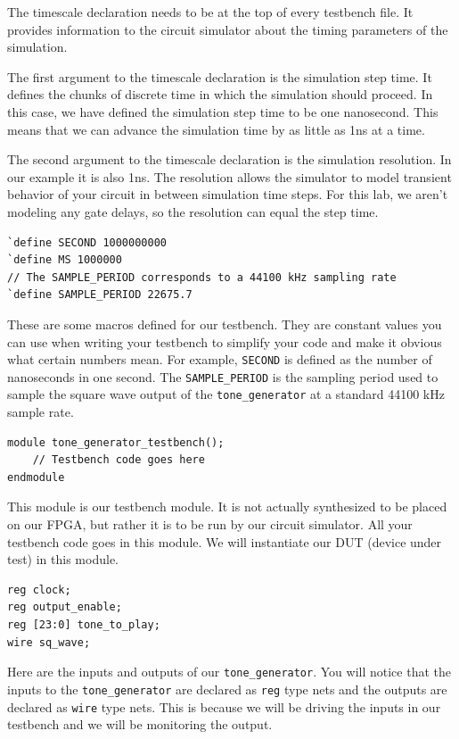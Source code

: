 \documentclass[11pt]{article}
\begin{document}
The timescale declaration needs to be at the top of every testbench file. It provides information to the circuit simulator about the timing parameters of the simulation.

The first argument to the timescale declaration is the simulation step time. It defines the chunks of discrete time in which the simulation should proceed. In this case, we have defined the simulation step time to be one nanosecond. This means that we can advance the simulation time by as little as 1ns at a time.

The second argument to the timescale declaration is the simulation resolution. In our example it is also 1ns. The resolution allows the simulator to model transient behavior of your circuit in between simulation time steps. For this lab, we aren't modeling any gate delays, so the resolution can equal the step time.

\begin{verbatim}
`define SECOND 1000000000
`define MS 1000000
// The SAMPLE_PERIOD corresponds to a 44100 kHz sampling rate
`define SAMPLE_PERIOD 22675.7
\end{verbatim}

These are some macros defined for our testbench. They are constant values you can use when writing your testbench to simplify your code and make it obvious what certain numbers mean. For example, \verb|SECOND| is defined as the number of nanoseconds in one second. The \verb|SAMPLE_PERIOD| is the sampling period used to sample the square wave output of the \verb|tone_generator| at a standard 44100 kHz sample rate.

\begin{verbatim}
module tone_generator_testbench();
	// Testbench code goes here
endmodule
\end{verbatim}

This module is our testbench module. It is not actually synthesized to be placed on our FPGA, but rather it is to be run by our circuit simulator. All your testbench code goes in this module. We will instantiate our DUT (device under test) in this module.

\begin{verbatim}
reg clock;
reg output_enable;
reg [23:0] tone_to_play;
wire sq_wave;
\end{verbatim}

Here are the inputs and outputs of our \verb|tone_generator|. You will notice that the inputs to the \verb|tone_generator| are declared as \verb|reg| type nets and the outputs are declared as \verb|wire| type nets. This is because we will be driving the inputs in our testbench and we will be monitoring the output.
\end{document}
